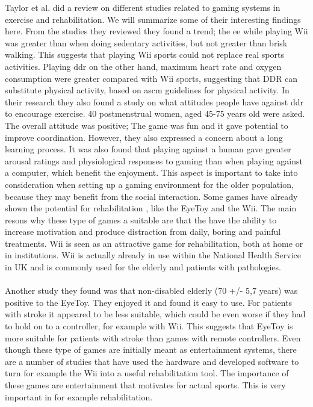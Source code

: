 Taylor et al. \cite{taylor2011activity} did a review on different studies related to gaming systems in exercise and rehabilitation. We will summarize some of their interesting findings here. From the studies they reviewed they found a trend; the  \ac{ee} while playing Wii was greater than when doing sedentary activities, but not greater than brisk walking. This suggests that playing Wii sports could not replace real sports activities. Playing \ac{ddr} on the other hand, maximum heart rate and oxygen consumption were greater compared with Wii sports, suggesting that DDR can substitute physical activity, based on \ac{ascm} guidelines for physical activity. In their research they also found a study on what attitudes people have against \ac{ddr} to encourage exercise. 40 postmenstrual women, aged 45-75 years old were asked. The overall attitude was positive; The game was fun and it gave potential to improve coordination. However, they also expressed a concern about a long learning process. It was also found that playing against a human gave greater arousal ratings and physiological responses to gaming than when playing against a computer, which benefit the enjoyment. This aspect is important to take into consideration when setting up a gaming environment for the older population, because they may benefit from the social interaction. Some games have already shown the potential for rehabilitation , like the EyeToy and the Wii. The main resons why these type of games a suitable are that the have the ability to increase motivation and produce distraction from daily, boring and painful treatments. Wii is seen as an attractive game for rehabilitation, both at home or in institutions. Wii is actually already in use within the National Health Service in UK and is commonly used for the elderly and patients with pathologies.  \cite{taylor2011activity} \\ \\
Another study they found was that non-disabled  elderly (70 +/- 5,7 years) was positive to the EyeToy. They enjoyed it and found it easy to use. For patients with stroke it appeared to be less suitable, which could be even worse if they had to hold on to a controller, for example with Wii. This suggests that EyeToy is more suitable for patients with stroke than games with remote controllers.  
Even though these type of games are initially meant as entertainment systems, there are a number of studies that have used the hardware and developed software to turn for example the Wii into a useful rehabilitation tool. The importance of these games are entertainment that motivates for actual sports. This is very important in for example rehabilitation. \cite{taylor2011activity} \\ \\
